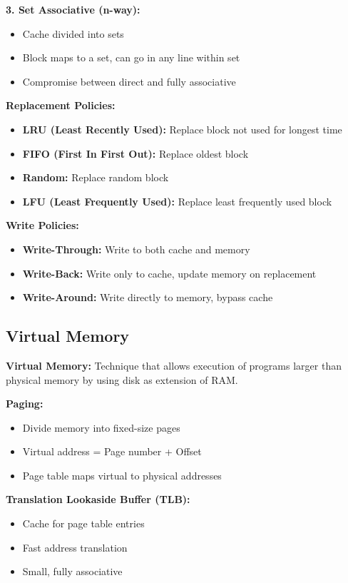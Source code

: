 \documentclass[11pt,a4paper]{article}
\begin{document}
\textbf{3. Set Associative (n-way):}
\begin{itemize}
    \item Cache divided into sets
    \item Block maps to a set, can go in any line within set
    \item Compromise between direct and fully associative
\end{itemize}

\textbf{Replacement Policies:}
\begin{itemize}
    \item \textbf{LRU (Least Recently Used):} Replace block not used for longest time
    \item \textbf{FIFO (First In First Out):} Replace oldest block
    \item \textbf{Random:} Replace random block
    \item \textbf{LFU (Least Frequently Used):} Replace least frequently used block
\end{itemize}

\textbf{Write Policies:}
\begin{itemize}
    \item \textbf{Write-Through:} Write to both cache and memory
    \item \textbf{Write-Back:} Write only to cache, update memory on replacement
    \item \textbf{Write-Around:} Write directly to memory, bypass cache
\end{itemize}

\subsection{Virtual Memory}

\begin{defbox}
\textbf{Virtual Memory:} Technique that allows execution of programs larger than physical memory by using disk as extension of RAM.
\end{defbox}

\textbf{Paging:}
\begin{itemize}
    \item Divide memory into fixed-size pages
    \item Virtual address = Page number + Offset
    \item Page table maps virtual to physical addresses
\end{itemize}

\textbf{Translation Lookaside Buffer (TLB):}
\begin{itemize}
    \item Cache for page table entries
    \item Fast address translation
    \item Small, fully associative
\end{itemize}
\end{document}
